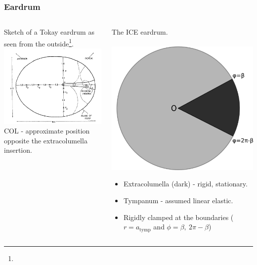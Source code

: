 \documentclass{beamer}
\let\oldfootnotesize\footnotesize
\renewcommand*{\footnotesize}{\oldfootnotesize\tiny}
\begin{document}
\begin{frame}
\frametitle{Eardrum}
\begin{columns}
    \begin{column}{0.5\textwidth}
      \centering
      \small
      Sketch of a Tokay eardrum as seen from the outside\footnote{}.\\
      \includegraphics[width = 3.7 cm]{Diagrams/geckoear.png}\\
      \footnotesize
     COL - approximate position opposite the extracolumella insertion.
    \end{column}

    \begin{column}{0.5\textwidth}
      \centering
      \small
      The ICE eardrum.\\
      \textbf{}\\
      \includegraphics[width = 3.2 cm]{Diagrams/tympanummodel.png}\\
\footnotesize
\begin{itemize}
      \item[] Extracolumella (dark) - rigid, stationary.
      \item[] Tympanum - assumed linear elastic.
      \item[] Rigidly clamped at the boundaries ($r=a_{\mathrm{tymp}}$ and $\phi=\beta,\ 2\pi-\beta$)
\end{itemize}

    \end{column}
  \end{columns}
  
\end{frame}
\end{document}
